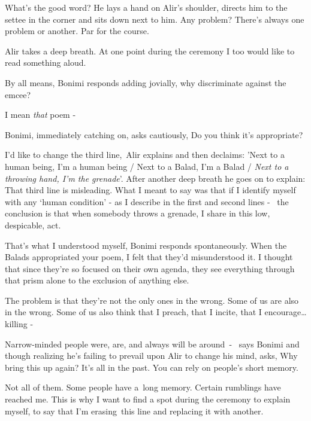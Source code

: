 \documentclass[letterpaper]{article}
\begin{document}
{\textquotedbl}What's the good word?{\textquotedbl} He lays a hand on Alir's shoulder, directs him to the settee in the
corner and sits down next to him. {\textquotedbl}Any problem? There's always one problem or another. Par for the
course.{\textquotedbl} 

Alir takes a deep breath. {\textquotedbl}At one point during the ceremony I too would like to read something
aloud.{\textquotedbl} 

{\textquotedbl}By all means,{\textquotedbl} Bonimi responds adding jovially, {\textquotedbl}why discriminate against the
emcee?{\textquotedbl} 

{\textquotedbl}I mean \textit{that} poem -{\textquotedbl} 

Bonimi, immediately catching on, asks cautiously, {\textquotedbl}Do you think it's appropriate?{\textquotedbl} 

{\textquotedbl}I'd like to change the third line,{\textquotedbl}\ Alir explains and then declaims: {\textquotedbl}'Next
to a human being, I'm a human being / Next to a Balad, I'm a Balad / \textit{Next to a throwing hand, I'm the
grenade}{}'.{\textquotedbl} After another deep breath he goes on to explain: {\textquotedbl}That third line is
misleading. What I meant to say was that if I identify myself with any `human condition' - as I describe in the first
and second lines -~ the conclusion is that when somebody throws a grenade, I share in this low, despicable, act.
{\textquotedbl} 

{\textquotedbl}That's what I understood myself,{\textquotedbl} Bonimi responds spontaneously. {\textquotedbl}When the
Balads appropriated your poem, I felt that they'd misunderstood it. I thought that since they're so focused on their
own agenda, they see everything through that prism alone to the exclusion of anything else.{\textquotedbl} 

{\textquotedbl}The problem is that they're not the only ones in the wrong. Some of us are also in the wrong. Some of us
also think that I preach, that I incite, that I encourage{\dots} killing -{\textquotedbl} 

{\textquotedbl}Narrow-minded people were, are, and always will be around\ {}- {\textquotedbl}\ says Bonimi and though
realizing he's failing to prevail upon Alir to change his mind, asks, {\textquotedbl}Why bring this up again? It's all
in the past. You can rely on people's short memory.{\textquotedbl} 

{\textquotedbl}Not all of them. Some people have a~long memory. Certain rumblings have reached me. This is why I want to
find a spot during the ceremony to explain myself, to say that I'm erasing~this line and replacing it with
another.{\textquotedbl}\ 
\end{document}
